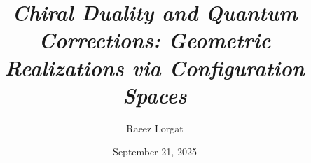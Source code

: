 \documentclass[11pt]{article}
\title{\it{Chiral Duality and Quantum Corrections: Geometric Realizations via Configuration Spaces}}
\author{Raeez Lorgat}
\date{September 21, 2025}
\begin{document}
\newcommand{\barBgeom}{\bar{B}_{\text{geom}}}  %
\newcommand{\barBch}{\bar{B}^{\text{ch}}}       %
\newcommand{\Omegach}{\Omega^{\text{ch}}}       %
\newcommand{\ConfigSpace}[1]{\overline{C}_{#1}(X)}  %
\newcommand{\LogForm}[2]{\eta_{#1#2}}           %
\newcommand{\OPEcoeff}[4]{C_{#1#2}^{#3,#4}}    %
\newcommand{\ChirAlg}{\mathsf{ChirAlg}}         %
\newcommand{\dgCoalg}{\mathsf{dgCoalg}}         %




\maketitle
 
\end{document}

